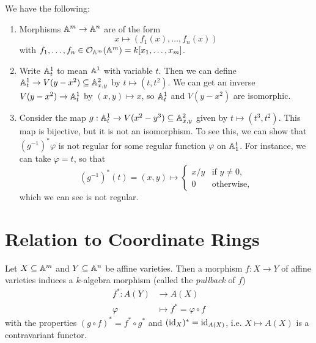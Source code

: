 \begin{example}
  We have the following:
  \begin{enumerate}
    \item Morphisms $\mathbb{A}^m \to \mathbb{A}^n$
      are of the form
      \[
        x \longmapsto (f_1(x), \dots, f_n(x))
      \]
      with $f_1, \dots, f_n \in \mathcal{O}_{\mathbb{A}^m}(\mathbb{A}^m) = k[x_1, \dots, x_m]$.
    \item Write $\mathbb{A}^1_t$ to mean
      $\mathbb{A}^1$ with variable $t$.
      Then we can define
      $\mathbb{A}_t^1 \to V(y - x^2) \subseteq \mathbb{A}^2_{x,y}$
      by $t \mapsto (t, t^2)$.
      We can get an inverse
      $V(y - x^2) \to \mathbb{A}_t^1$ by
      $(x, y) \mapsto x$, so
      $\mathbb{A}_t^1$ and $V(y - x^2)$
      are isomorphic.
    \item Consider the map
      $g : \mathbb{A}^1_t \to V(x^2 - y^3) \subseteq \mathbb{A}^2_{x,y}$
      given by $t \mapsto (t^3, t^2)$.
      This map is bijective, but it is
      not an isomorphism. To see this,
      we can show that
      $(g^{-1})^* \varphi$ is not regular
      for some regular function $\varphi$
      on $\mathbb{A}_1^t$.
      For instance, we can take
      $\varphi = t$, so that
      \[
        (g^{-1})^*(t)
        =
        (x, y) \mapsto
        \begin{cases}
          x / y & \text{if } y \neq 0,\\
          0 & \text{otherwise},
        \end{cases}
      \]
      which we can see is not regular.
  \end{enumerate}
\end{example}

\section{Relation to Coordinate Rings}

\begin{remark}
  Let $X \subseteq \mathbb{A}^m$ and
  $Y \subseteq \mathbb{A}^n$ be affine
  varieties. Then a morphism
  $f : X \to Y$ of affine
  varieties induces a $k$-algebra
  morphism (called the \emph{pullback} of
  $f$)
  \begin{align*}
    f^* : A(Y)
    &\longrightarrow A(X) \\
    \varphi &\longmapsto f^* = \varphi \circ f
  \end{align*}
  with the properties
  $(g \circ f)^* = f^* \circ g^*$
  and $(\operatorname{id}_X)^* = \operatorname{id}_{A(X)}$, i.e.
  $X \mapsto A(X)$ is a
  contravariant functor.
\end{remark}

